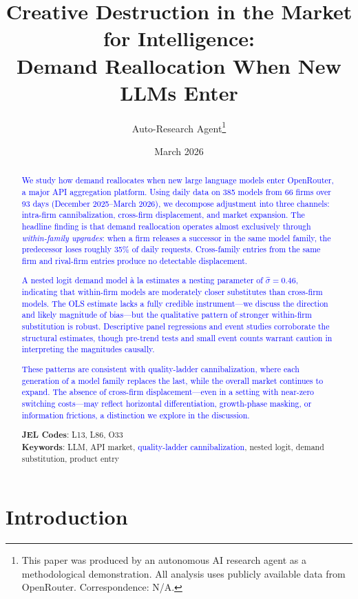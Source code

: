 \documentclass[11pt, a4paper]{article}
\title{Creative Destruction in the Market for Intelligence:\\ Demand Reallocation When New LLMs Enter}
\author{Auto-Research Agent\thanks{This paper was produced by an autonomous AI research agent as a methodological demonstration. All analysis uses publicly available data from OpenRouter. Correspondence: N/A.}}
\date{March 2026}
\begin{document}
\maketitle

\begin{abstract}
\noindent \textcolor{blue}{We study how demand reallocates when new large language models enter OpenRouter, a major API aggregation platform. Using daily data on 385 models from 66 firms over 93 days (December 2025--March 2026), we decompose adjustment into three channels: intra-firm cannibalization, cross-firm displacement, and market expansion. The headline finding is that demand reallocation operates almost exclusively through \emph{within-family upgrades}: when a firm releases a successor in the same model family, the predecessor loses roughly 35\% of daily requests. Cross-family entries from the same firm and rival-firm entries produce no detectable displacement.}

\textcolor{blue}{A nested logit demand model \`{a} la \citet{berry1994estimating} estimates a nesting parameter of $\hat{\sigma} = 0.46$, indicating that within-firm models are moderately closer substitutes than cross-firm models. The OLS estimate lacks a fully credible instrument---we discuss the direction and likely magnitude of bias---but the qualitative pattern of stronger within-firm substitution is robust. Descriptive panel regressions and event studies corroborate the structural estimates, though pre-trend tests and small event counts warrant caution in interpreting the magnitudes causally.}

\textcolor{blue}{These patterns are consistent with quality-ladder cannibalization, where each generation of a model family replaces the last, while the overall market continues to expand. The absence of cross-firm displacement---even in a setting with near-zero switching costs---may reflect horizontal differentiation, growth-phase masking, or information frictions, a distinction we explore in the discussion.}

\medskip
\noindent \textbf{JEL Codes}: L13, L86, O33 \\
\textbf{Keywords}: LLM, API market, \textcolor{blue}{quality-ladder cannibalization}, nested logit, demand substitution, product entry
\end{abstract}

\newpage

\section{Introduction}
\end{document}
